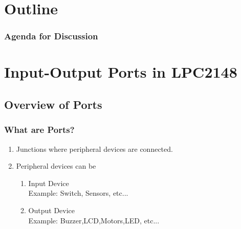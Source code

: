 \documentclass[10pt,red]{beamer}
\title
[
	Firebird LPC2148 Robotics Research Platform	%
	\hspace{0.5cm}
	\insertframenumber/\inserttotalframenumber
]
{
	Basic IO Interfacing on Firebird-V 
}
\author
[
	www.e-yantra.org
]
{
	e-Yantra Team \\
  Embedded Real-Time Systems Lab\\
  Indian Institute of Technology-Bombay \\
}
\date
{
IIT Bombay \\ {\today}
}
\begin{document}
 

\begin{frame}
	\titlepage
\end{frame} 

\section*{Outline}
\begin{frame}
	\frametitle{Agenda for Discussion}
	\tableofcontents
\end{frame} 


\section{Input-Output Ports in LPC2148}
\subsection{Overview of Ports}
\begin{frame}
	\frametitle{What are Ports?} \pause
		\begin{enumerate}
			\item<+-|alert@+> Junctions where peripheral devices are connected. \\[10pt]
			\item<+-|alert@+> Peripheral devices can be  \\[10pt]
				\begin{enumerate}
				\item<+-|alert@+> Input Device  \\[10pt]
				 Example: Switch, Sensors, etc...\\[10pt]
				 \item<+-|alert@+> Output Device  \\[10pt]
				 Example: Buzzer,LCD,Motors,LED, etc...    
				\end{enumerate}
		\end{enumerate}
\end{frame}
\end{document}
